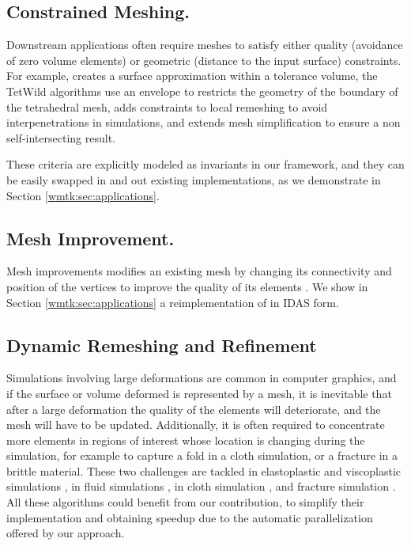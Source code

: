 \subsection{Constrained Meshing.}

Downstream applications often require meshes to satisfy either quality (avoidance of zero volume elements) or geometric (distance to the input surface) constraints. For example, \citet{mandad2015isotopic} creates a surface approximation within a tolerance volume, the TetWild algorithms \cite{hu2018tetrahedral,Hu:2019:fTetWild} use an envelope \cite{Wang:2021} to restricts the geometry of the boundary of the tetrahedral mesh, \cite{Brochu:2012} adds constraints to local remeshing to avoid interpenetrations in simulations, and \cite{gumhold2003intersection} extends mesh simplification \cite{Garland:1999,Popovic:1997} to ensure a non self-intersecting result. 

These criteria are explicitly modeled as invariants in our framework, and they can be easily swapped in and out existing implementations, as we demonstrate in Section \ref{wmtk:sec:applications}.

\subsection{Mesh Improvement.} 

Mesh improvements modifies an existing mesh by changing its connectivity and position of the vertices to improve the quality of its elements \cite{Canann1996,CANANN1993185,Lori1998,Lipman:2012,Chen:2004:ODT,alliez2005variational,feng2018curved,hu2018tetrahedral,Alexa:2019,Klingner07aggressive}.
%
%
We show in Section \ref{wmtk:sec:applications} a reimplementation of \cite{Alexa:2019} in IDAS form.

\subsection{Dynamic Remeshing and Refinement} 

Simulations involving large deformations are common in computer graphics, and if the surface or volume deformed is represented by a mesh, it is inevitable that after a large deformation the quality of the elements will deteriorate, and the mesh will have to be updated. Additionally, it is often required to concentrate more elements in regions of interest whose location is changing during the simulation, for example to capture a fold in a cloth simulation, or a fracture in a brittle material.
%
These two challenges are tackled in elastoplastic and viscoplastic simulations \cite{Hutchinson:1996,Bargteil:2007,Wicke:2010,Wojtan:2008}, in fluid simulations \cite{Misztal:2012,Klingner:2006,Ando:2013,Chentanez:2007,clausen:2013}, in cloth simulation \cite{Villard:2002,Bender:2013,Li:2005,Narain:2012,Narain:2013,Pfaff:2014,Simnett:2009}, and fracture simulation \cite{Busaryev:2013}. All these algorithms could benefit from our contribution, to simplify their implementation and obtaining speedup due to the automatic parallelization offered by our approach.

